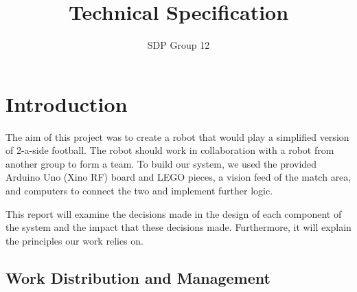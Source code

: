 ﻿\documentclass[12pt,a4paper,titlepage]{article}
\author{SDP Group 12}
\title{Technical Specification}
\begin{document}
\maketitle

\tableofcontents
\clearpage





\section{Introduction}

The aim of this project was to create a robot that would play a simplified version of 2-a-side football. The robot should work in collaboration with a robot from another group to form a team. To build our system, we used the provided Arduino Uno (Xino RF) board and LEGO pieces, a vision feed of the match area, and computers to connect the two and implement further logic.

This report will examine the decisions made in the design of each component of the system and the impact that these decisions made. Furthermore, it will explain the principles our work relies on.

\subsection{Work Distribution and Management}
\end{document}
